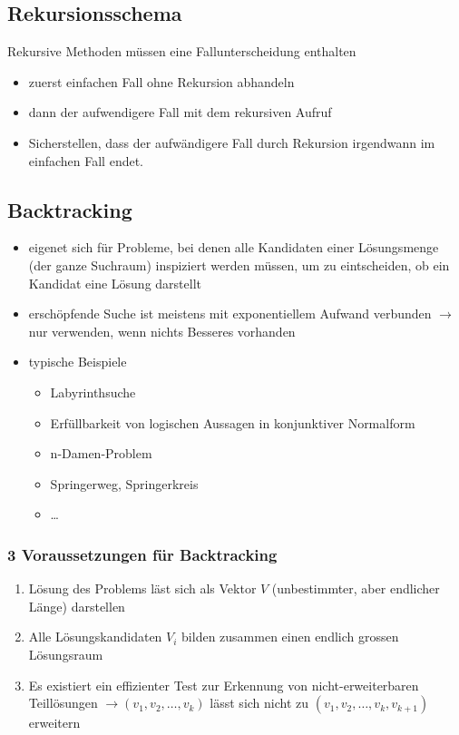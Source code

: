 \documentclass[a4paper,10pt]{article}
\begin{document}
\subsection{Rekursionsschema}
Rekursive Methoden m\"ussen eine Fallunterscheidung enthalten
\begin{itemize}
\item zuerst einfachen Fall ohne Rekursion abhandeln
\item dann der aufwendigere Fall mit dem rekursiven Aufruf
\item Sicherstellen, dass der aufw\"andigere Fall durch Rekursion irgendwann im einfachen Fall endet.
\end{itemize}


\subsection{Backtracking}
\begin{itemize}
\item eigenet sich f\"ur Probleme, bei denen alle Kandidaten einer L\"osungsmenge (der ganze Suchraum) inspiziert werden m\"ussen, um zu eintscheiden, ob ein Kandidat eine L\"osung darstellt
\item ersch\"opfende Suche ist meistens mit exponentiellem Aufwand verbunden $\to$ nur verwenden, wenn nichts Besseres vorhanden
\item typische Beispiele
	\begin{itemize}
	\item Labyrinthsuche
	\item Erf\"ullbarkeit von logischen Aussagen in konjunktiver Normalform
	\item n-Damen-Problem
	\item Springerweg, Springerkreis
	\item \dots
	\end{itemize}
\end{itemize}

\subsubsection{3 Voraussetzungen f\"ur Backtracking}
\begin{enumerate}
\item L\"osung des Problems l\"ast sich als Vektor $V$ (unbestimmter, aber endlicher L\"ange) darstellen
\item Alle L\"osungskandidaten $V_i$ bilden zusammen einen endlich grossen L\"osungsraum
\item Es existiert ein effizienter Test zur Erkennung von nicht-erweiterbaren Teill\"osungen $\to(v_1,v_2,\dots,v_k)$ l\"asst sich nicht zu $(v_1,v_2,\dots,v_k,v_{k+1})$ erweitern
\end{enumerate}
\end{document}
